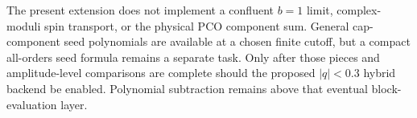 \documentclass[11pt]{article}
\begin{document}
The present extension does not implement a confluent $b=1$ limit,
complex-moduli spin transport, or the physical PCO component sum.
General cap-component seed polynomials are available at a chosen finite
cutoff, but a compact all-orders seed formula remains a separate task.
Only after those pieces and amplitude-level comparisons are complete
should the proposed $|q|<0.3$ hybrid backend be enabled.  Polynomial
subtraction remains above that eventual block-evaluation layer.
\end{document}
